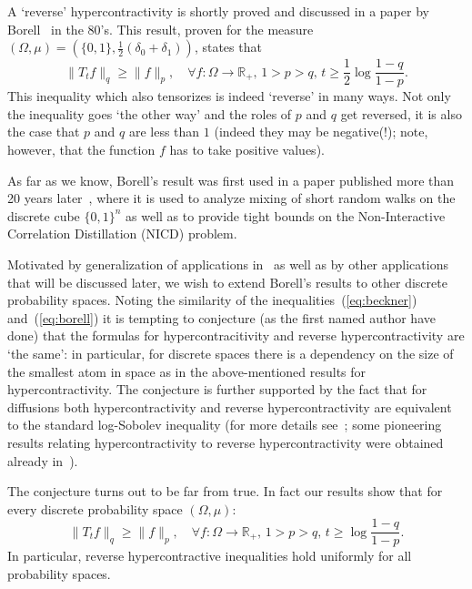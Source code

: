 \documentclass[11pt]{amsart}
\newcommand{\R}{\mathbb{R}}
\newcommand{\1}{\mathbf{1}}
\def\R{{\mathbb R}}
\theoremstyle{definition}
\theoremstyle{plain}
\theoremstyle{remark}
\numberwithin{equation}{section}
\begin{document}
A `reverse' hypercontractivity is shortly proved and discussed in a paper by Borell~\cite{Borell82} in the 80's.
This result, proven for the measure $(\Omega,\mu) = (\{0,1\},\frac{1}{2} (\delta_0 + \delta_1))$, states that
\begin{equation} \label{eq:borell}
\|T_t f \|_q \geq \| f \|_p, \quad \forall f : \Omega \to \R_{+},\, 1>p > q ,\, t \geq \frac{1}{2} \log \frac{1 - q}{1-p}.
\end{equation}
This inequality which also tensorizes is indeed `reverse' in many ways. Not only the inequality goes `the other way' and
the roles of $p$ and $q$ get reversed, it is also the case that $p$ and $q$ are less than $1$ (indeed they may be negative(!);  note, however, that the function $f$ has to take
positive values).

As far as we know, Borell's result was first used in a paper published more than 20 years later~\cite{Mossel06}, where it is used to analyze mixing of short random walks on the discrete cube $\{0,1\}^n$ as well as to provide tight bounds on the Non-Interactive Correlation Distillation (NICD) problem. 

Motivated by generalization of applications in~\cite{Mossel06} as well as by other applications that will be discussed later, we wish to extend Borell's results to other discrete probability spaces.
Noting the similarity of the inequalities~(\ref{eq:beckner}) and~(\ref{eq:borell}) it is tempting to conjecture
(as the first named author have done) that the formulas for hypercontracitivity and reverse hypercontractivity are `the same': in particular, for discrete spaces there is a dependency on the size of the smallest atom in space as in the above-mentioned results for hypercontractivity. The conjecture is further supported by the fact that for diffusions both hypercontractivity and reverse hypercontractivity are equivalent to the standard log-Sobolev inequality (for more details see~\cite{Bakry:94}; some pioneering results relating hypercontractivity to reverse hypercontractivity were obtained already in~\cite{BorellJanson82}). 

The conjecture turns out to be far from true. 
In fact our results show that for every discrete probability space
$(\Omega,\mu)$:
\begin{equation} \label{eq:main}
\|T_t f \|_q \geq \| f \|_p, \quad \forall f : \Omega \to \R_{+},\, 1>p > q ,\, t \geq  \log \frac{1- q}{1-p}.
\end{equation}
In particular, reverse hypercontractive inequalities hold uniformly for all probability spaces.
\end{document}
